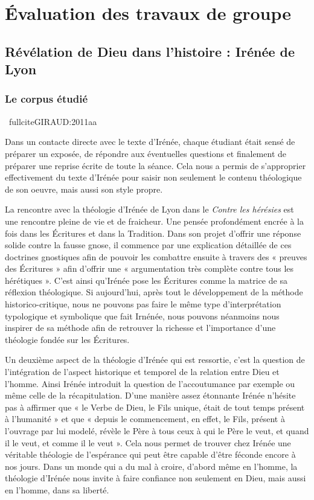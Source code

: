 \section{Évaluation des travaux de groupe}

\subsection{Révélation de Dieu dans l’histoire : Irénée de Lyon}
\subsubsection*{Le corpus étudié}
{\footnotesize


	\ fullcite{GIRAUD:2011aa}
}
Dans un contacte directe avec le texte d’Irénée, chaque étudiant était sensé de préparer un exposée, de répondre aux éventuelles questions et finalement de préparer une reprise écrite de toute la séance. Cela nous a permis de s’approprier effectivement du texte d’Irénée pour saisir non seulement le contenu théologique de son oeuvre, mais aussi son style propre.

La rencontre avec la théologie d'Irénée de Lyon dans le \emph{Contre les hérésies} est une rencontre pleine de vie et de fraicheur. Une pensée profondément encrée à la fois dans les Écritures et dans la Tradition.  Dans son projet d'offrir une réponse solide contre la fausse gnose, il commence par une explication détaillée de ces doctrines gnostiques afin de pouvoir les combattre ensuite à travers des « preuves des Écritures » afin d'offrir une « argumentation très complète contre tous les hérétiques ». C'est ainsi qu'Irénée pose les Écritures comme la matrice de sa réflexion théologique. Si aujourd'hui, après tout le développement de la méthode historico-critique, nous ne pouvons pas faire le même type d'interprétation typologique et symbolique que fait Irnénée, nous pouvons néanmoins nous inspirer de sa méthode afin de retrouver la richesse et l'importance d'une théologie fondée sur les Écritures.

Un deuxième aspect de la théologie d'Irénée qui est ressortie, c'est la question de l'intégration de l'aspect historique et temporel de la relation entre Dieu et l'homme. Ainsi Irénée introduit la question de l'accoutumance par exemple ou même celle de la récapitulation. D'une manière assez étonnante Irénée n'hésite pas à affirmer que « le Verbe de Dieu, le Fils unique, était de tout temps présent à l'humanité » et que « depuis le commencement, en effet, le Fils, présent à l'ouvrage par lui modelé, révèle le Père à tous ceux à qui le Père le veut, et quand il le veut, et comme il le veut ». Cela nous permet de trouver chez Irénée une véritable théologie de l'espérance qui peut être capable d'être féconde encore à nos jours. Dans un monde qui a du mal à croire, d'abord même en l'homme, la théologie d'Irénée nous invite à faire confiance non seulement en Dieu, mais aussi en l'homme, dans sa liberté.

